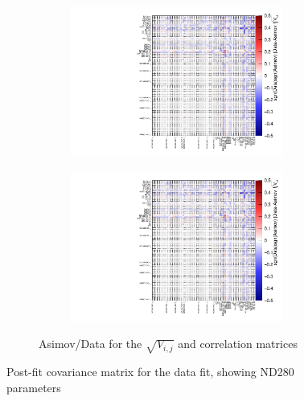\begin{figure}[h]
\begin{subfigure}[t]{\textwidth}
	\begin{subfigure}[t]{0.49\textwidth}
		\includegraphics[width=\textwidth, trim={0mm 0mm 0mm 0mm}, clip,page=1]{figures/mach3/data/corr/data_asimov_corr_ratio}
	\end{subfigure}
	\begin{subfigure}[t]{0.49\textwidth}
		\includegraphics[width=\textwidth, trim={0mm 0mm 0mm 0mm}, clip,page=2]{figures/mach3/data/corr/data_asimov_corr_ratio}
	\end{subfigure}
	\caption{Asimov/Data for the $\sqrt{V_{i,j}}$ and correlation matrices}
\end{subfigure}
\caption{Post-fit covariance matrix for the data fit, showing ND280 parameters}
\label{fig:postfit_corr_nd280}
\end{figure}


